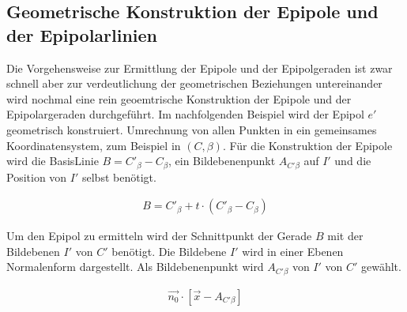 \subsection{Geometrische Konstruktion der Epipole und der Epipolarlinien}


Die Vorgehensweise zur Ermittlung der Epipole und der Epipolgeraden ist zwar schnell aber zur verdeutlichung der geometrischen Beziehungen untereinander wird nochmal eine rein geoemtrische Konstruktion der Epipole und der Epipolargeraden durchgeführt. Im nachfolgenden Beispiel wird der Epipol \ensuremath{e'} geometrisch konstruiert. Umrechnung von allen Punkten in ein gemeinsames Koordinatensystem, zum Beispiel in $(C,\beta)$. Für die Konstruktion der Epipole wird die BasisLinie $B = C'_\beta - C_\beta$, ein Bildebenenpunkt $A_{C'\beta}$ auf $I'$ und die Position von $I'$ selbst benötigt.


\begin{gather}
B = C'_\beta + t\cdot (C'_\beta-C_\beta)
\end{gather}

Um den Epipol zu ermitteln wird der Schnittpunkt der Gerade $B$ mit der Bildebenen $I'$ von $C'$ benötigt. Die Bildebene $I'$ wird in einer Ebenen Normalenform dargestellt. Als Bildebenenpunkt wird $A_{C'\beta}$ von $I'$ von $C'$ gewählt.


\begin{gather}
\vec{n_0}\cdot[\vec{x}-A_{C'\beta}]
\end{gather}


